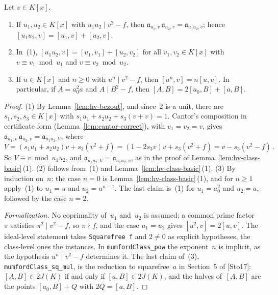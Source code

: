 \begin{lemma}[Factorization]
\label{lem:hv-factor}
\leanok
{}
Let $v \in K[x]$.
\begin{enumerate}
  \item If $u_1, u_2 \in K[x]$ with $u_1 u_2 \mid v^2 - f$, then
    $\mathfrak a_{u_1,v}\,\mathfrak a_{u_2,v} = \mathfrak a_{u_1 u_2, v}$; hence
    $[u_1 u_2, v] = [u_1, v] + [u_2, v]$.
  \item In~(1), $[u_1 u_2, v] = [u_1, v_1] + [u_2, v_2]$ for all $v_1, v_2 \in K[x]$ with
    $v \equiv v_1 \bmod u_1$ and $v \equiv v_2 \bmod u_2$.
  \item If $u \in K[x]$ and $n \ge 0$ with $u^n \mid v^2 - f$, then $[u^n, v] = n[u, v]$. In
    particular, if $A = a_0^2 a$ and $A \mid B^2 - f$, then $[A, B] = 2[a_0, B] + [a, B]$.
\end{enumerate}
\end{lemma}

\begin{proof}
\leanok
{}
(1) By Lemma~\ref{lem:hv-bezout}, and since~$2$ is a unit, there are $s_1, s_2, s_3 \in K[x]$
with $s_1 u_1 + s_2 u_2 + s_3 (v + v) = 1$. Cantor's composition in certificate form
(Lemma~\ref{lem:cantor-correct}), with $v_1 = v_2 = v$, gives
$\mathfrak a_{u_1,v}\,\mathfrak a_{u_2,v} = \mathfrak a_{u_1 u_2, V}$, where
\[ V = (s_1 u_1 + s_2 u_2) v + s_3 (v^2 + f) = (1 - 2 s_3 v) v + s_3 (v^2 + f)
     = v - s_3 (v^2 - f)\,. \]
So $V \equiv v \bmod u_1 u_2$, and $\mathfrak a_{u_1 u_2, V} = \mathfrak a_{u_1 u_2, v}$, as in
the proof of Lemma~\ref{lem:hv-class-basic}\,(1). (2) follows from~(1) and
Lemma~\ref{lem:hv-class-basic}\,(1). (3) By induction on~$n$: the case $n = 0$ is
Lemma~\ref{lem:hv-class-basic}\,(1), and for $n \ge 1$ apply~(1) to $u_1 = u$ and
$u_2 = u^{n-1}$. The last claim is~(1) for $u_1 = a_0^2$ and $u_2 = a$, followed by the case
$n = 2$.

\emph{Formalization.} No coprimality of~$u_1$ and~$u_2$ is assumed: a common prime factor~$\pi$
satisfies $\pi^2 \mid v^2 - f$, so $\pi \nmid f$, and the case $u_1 = u_2$ gives
$[u^2, v] = 2[u, v]$. The ideal-level statement takes \texttt{Squarefree f} and $2 \ne 0$ as
explicit hypotheses, the class-level ones the instances. In \texttt{mumfordClass\_pow} the
exponent~$n$ is implicit, as the hypothesis $u^n \mid v^2 - f$ determines it. The last claim
of~(3), \texttt{mumfordClass\_sq\_mul}, is the reduction to squarefree~$a$ in Section~5 of [Sto17]:
$[A, B] \in 2J(K)$ if and only if $[a, B] \in 2J(K)$, and the halves of~$[A, B]$ are the points
$[a_0, B] + Q$ with $2Q = [a, B]$.
\end{proof}

